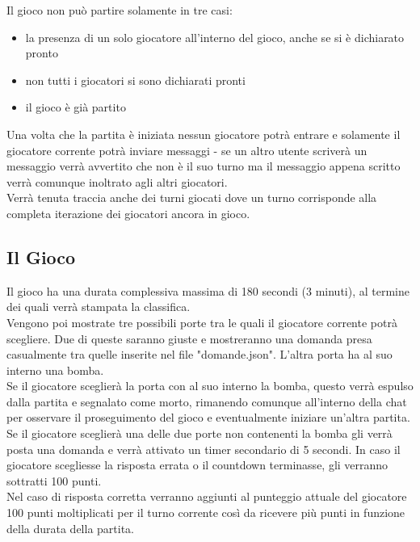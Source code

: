 \documentclass[a4paper,12pt]{report}
\begin{document}
Il gioco non può partire solamente in tre casi:
\begin{itemize}
	\item la presenza di un solo giocatore all'interno del gioco, anche se si è dichiarato pronto
	\item non tutti i giocatori si sono dichiarati pronti
	\item il gioco è già partito
\end{itemize}
Una volta che la partita è iniziata nessun giocatore potrà entrare e solamente il giocatore corrente potrà inviare messaggi - se un altro utente scriverà un messaggio verrà avvertito che non è il suo turno ma il messaggio appena scritto verrà comunque inoltrato agli altri giocatori.\\
Verrà tenuta traccia anche dei turni giocati dove un turno corrisponde alla completa iterazione dei giocatori ancora in gioco.\clearpage

\subsection{Il Gioco}
Il gioco ha una durata complessiva massima di 180 secondi (3 minuti), al termine dei quali verrà stampata la classifica.\\
Vengono poi mostrate tre possibili porte tra le quali il giocatore corrente potrà scegliere. Due di queste saranno giuste e mostreranno una domanda presa casualmente tra quelle inserite nel file "domande.json". L'altra porta ha al suo interno una bomba.\\
Se il giocatore sceglierà la porta con al suo interno la bomba, questo verrà espulso dalla partita e segnalato come morto, rimanendo comunque all'interno della chat per osservare il proseguimento del gioco e eventualmente iniziare un'altra partita.\\
Se il giocatore sceglierà una delle due porte non contenenti la bomba gli verrà posta una domanda e verrà attivato un timer secondario di 5 secondi. In caso il giocatore scegliesse la risposta errata o il countdown terminasse, gli verranno sottratti 100 punti.\\
Nel caso di risposta corretta verranno aggiunti al punteggio attuale del giocatore 100 punti moltiplicati per il turno corrente così da ricevere più punti in funzione della durata della partita.\\
\end{document}
